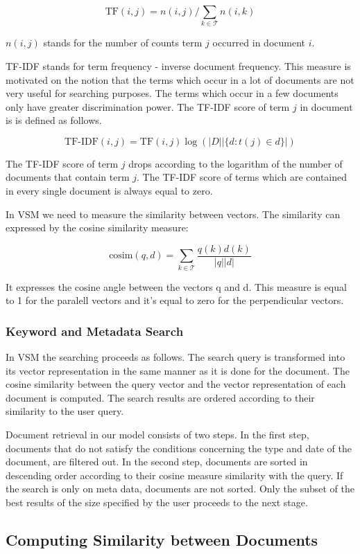 \[\text{TF}(i,j) = n(i,j) / \sum_{k \in \mathcal{T}}{n(i,k)}\]

$n(i,j)$ stands for the number of counts term $j$ occurred in document $i$.

TF-IDF stands for term frequency - inverse document frequency. This measure is motivated on the notion that the terms which occur in a lot of documents are not very useful for searching purposes. The terms which occur in a few documents only have greater discrimination power. The TF-IDF score of term $j$ in document is is defined as follows.

\[\text{TF-IDF}(i,j) = \text{TF}(i,j)\log{(|D| |\lbrace d : t(j) \in d \rbrace|)}\]

The TF-IDF score of term $j$ drops according to the logarithm of the number of documents that contain term $j$. The TF-IDF score of terms which are contained in every single document is always equal to zero.

In VSM we need to measure the similarity between vectors. The similarity can expressed by the cosine similarity measure:

\[\text{cosim}(q,d) = \sum_{k \in \mathcal{T}}\frac{q(k)d(k)}{|q||d|}\]

It expresses the cosine angle between the vectors q and d. This measure is equal to 1 for the paralell vectors and it's equal to zero for the perpendicular vectors.

\subsubsection{Keyword and Metadata Search}\label{sec:keyword_search}

In VSM the searching proceeds as follows. The search query is transformed into its vector representation in the same manner as it is done for the document. The cosine similarity between the query vector and the vector representation of each document is computed. The search results are ordered according to their similarity to the user query. 

Document retrieval in our model consists of two steps. In the first step, documents that do not satisfy the conditions concerning the type and date of the document, are filtered out. In the second step, documents are sorted in descending order according to their cosine measure similarity with the query. If the search is only on meta data, documents are not sorted. Only the subset of the best results of the size specified by the user proceeds to the next stage.

\subsection{Computing Similarity between Documents}\label{sec:computing_similarity_between_documents}
%

